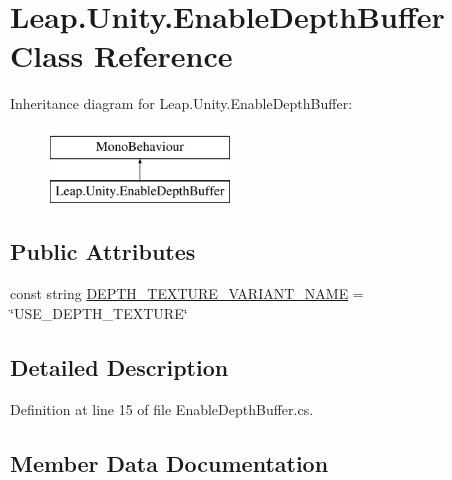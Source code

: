 \hypertarget{class_leap_1_1_unity_1_1_enable_depth_buffer}{}\section{Leap.\+Unity.\+Enable\+Depth\+Buffer Class Reference}
\label{class_leap_1_1_unity_1_1_enable_depth_buffer}
Inheritance diagram for Leap.\+Unity.\+Enable\+Depth\+Buffer\+:\begin{figure}[H]
\begin{center}
\leavevmode
\includegraphics[height=2.000000cm]{class_leap_1_1_unity_1_1_enable_depth_buffer}
\end{center}
\end{figure}
\subsection*{Public Attributes}
\begin{DoxyCompactItemize}
\item 
const string \mbox{\hyperlink{class_leap_1_1_unity_1_1_enable_depth_buffer_a12709bcf233d15d7615b6d1d06b4dc1b}{D\+E\+P\+T\+H\+\_\+\+T\+E\+X\+T\+U\+R\+E\+\_\+\+V\+A\+R\+I\+A\+N\+T\+\_\+\+N\+A\+ME}} = \char`\"{}U\+S\+E\+\_\+\+D\+E\+P\+T\+H\+\_\+\+T\+E\+X\+T\+U\+RE\char`\"{}
\end{DoxyCompactItemize}


\subsection{Detailed Description}


Definition at line 15 of file Enable\+Depth\+Buffer.\+cs.



\subsection{Member Data Documentation}
\mbox{\label{class_leap_1_1_unity_1_1_enable_depth_buffer_a12709bcf233d15d7615b6d1d06b4dc1b}} 
